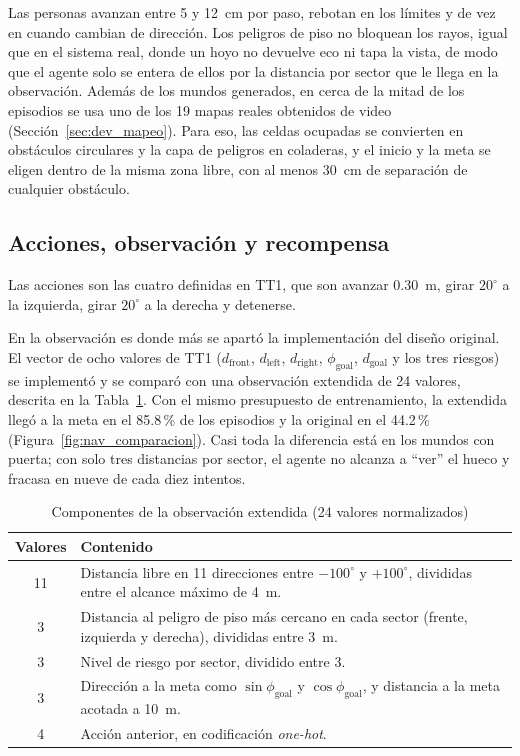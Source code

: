 Las personas avanzan entre 5 y 12~cm por paso, rebotan en los límites y de vez en
cuando cambian de dirección. Los peligros de piso no bloquean los rayos, igual que en el
sistema real, donde un hoyo no devuelve eco ni tapa la vista, de modo que el agente solo
se entera de ellos por la distancia por sector que le llega en la observación. Además de
los mundos generados, en cerca de la mitad de los episodios se usa uno de los 19 mapas
reales obtenidos de video (Sección~\ref{sec:dev_mapeo}). Para eso, las celdas ocupadas
se convierten en obstáculos circulares y la capa de peligros en coladeras, y el inicio y
la meta se eligen dentro de la misma zona libre, con al menos 30~cm de separación de
cualquier obstáculo.

\subsection{Acciones, observación y recompensa}

Las acciones son las cuatro definidas en TT1, que son avanzar 0.30~m, girar $20^\circ$ a
la izquierda, girar $20^\circ$ a la derecha y detenerse.

En la observación es donde más se apartó la implementación del diseño original. El
vector de ocho valores de TT1 ($d_{\text{front}}$, $d_{\text{left}}$,
$d_{\text{right}}$, $\phi_{\text{goal}}$, $d_{\text{goal}}$ y los tres riesgos) se
implementó y se comparó con una observación extendida de 24 valores, descrita en la
Tabla~\ref{tab:nav_obs}. Con el mismo presupuesto de entrenamiento, la extendida llegó
a la meta en el 85.8\,\% de los episodios y la original en el 44.2\,\%
(Figura~\ref{fig:nav_comparacion}). Casi toda la diferencia está en los mundos con
puerta; con solo tres distancias por sector, el agente no alcanza a ``ver'' el hueco y
fracasa en nueve de cada diez intentos.

\begin{table}[H]
\centering
\caption{Componentes de la observación extendida (24 valores normalizados)}
\label{tab:nav_obs}
\renewcommand{\arraystretch}{1.25}
\begin{tabular}{|c|p{11.8cm}|}
\hline
\textbf{Valores} & \textbf{Contenido} \\
\hline
11 & Distancia libre en 11 direcciones entre $-100^\circ$ y $+100^\circ$, divididas
entre el alcance máximo de 4~m. \\
\hline
3 & Distancia al peligro de piso más cercano en cada sector (frente, izquierda y
derecha), divididas entre 3~m. \\
\hline
3 & Nivel de riesgo por sector, dividido entre 3. \\
\hline
3 & Dirección a la meta como $\sin\phi_{\text{goal}}$ y $\cos\phi_{\text{goal}}$, y
distancia a la meta acotada a 10~m. \\
\hline
4 & Acción anterior, en codificación \emph{one-hot}. \\
\hline
\end{tabular}
\end{table}

